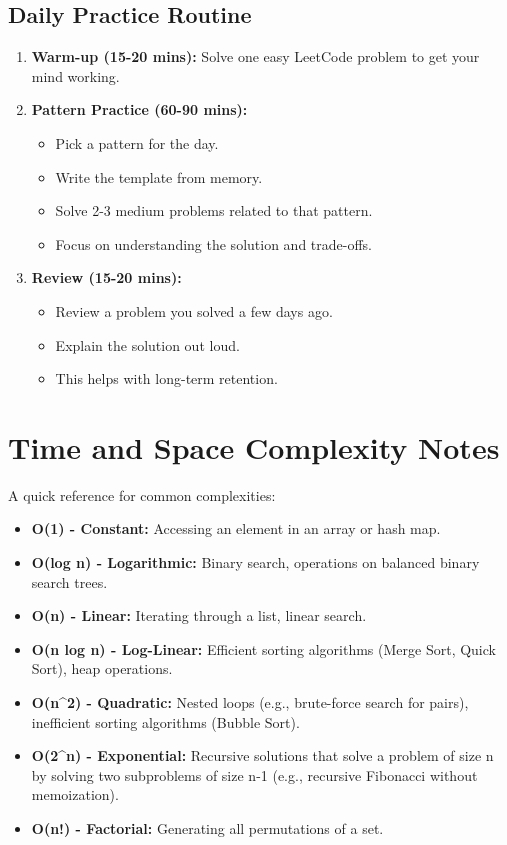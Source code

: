 \documentclass[11pt, a4paper]{article}
\begin{document}
\subsection{Daily Practice Routine}
\begin{enumerate}
    \item \textbf{Warm-up (15-20 mins):} Solve one easy LeetCode problem to get your mind working.
    \item \textbf{Pattern Practice (60-90 mins):}
    \begin{itemize}
        \item Pick a pattern for the day.
        \item Write the template from memory.
        \item Solve 2-3 medium problems related to that pattern.
        \item Focus on understanding the solution and trade-offs.
    \end{itemize}
    \item \textbf{Review (15-20 mins):}
    \begin{itemize}
        \item Review a problem you solved a few days ago.
        \item Explain the solution out loud.
        \item This helps with long-term retention.
    \end{itemize}
\end{enumerate}

\section{Time and Space Complexity Notes}
A quick reference for common complexities:
\begin{itemize}
    \item \textbf{O(1) - Constant:} Accessing an element in an array or hash map.
    \item \textbf{O(log n) - Logarithmic:} Binary search, operations on balanced binary search trees.
    \item \textbf{O(n) - Linear:} Iterating through a list, linear search.
    \item \textbf{O(n log n) - Log-Linear:} Efficient sorting algorithms (Merge Sort, Quick Sort), heap operations.
    \item \textbf{O(n\textasciicircum2) - Quadratic:} Nested loops (e.g., brute-force search for pairs), inefficient sorting algorithms (Bubble Sort).
    \item \textbf{O(2\textasciicircum n) - Exponential:} Recursive solutions that solve a problem of size n by solving two subproblems of size n-1 (e.g., recursive Fibonacci without memoization).
    \item \textbf{O(n!) - Factorial:} Generating all permutations of a set.
\end{itemize}
\end{document}

